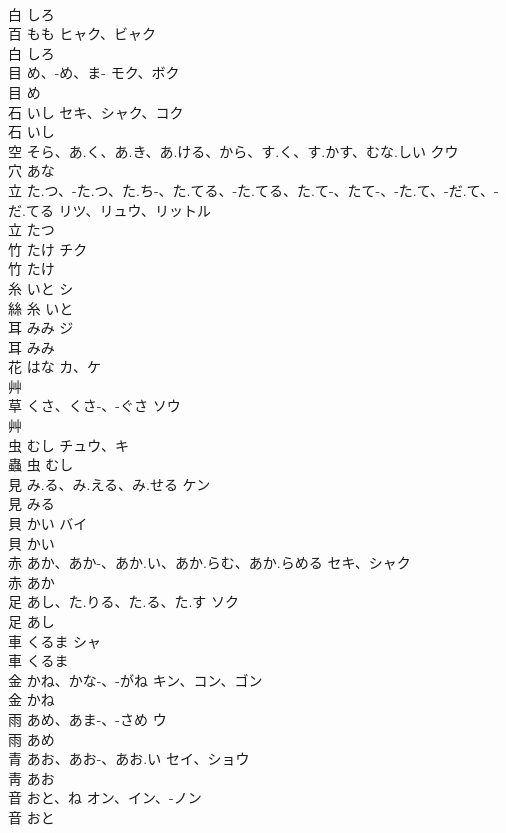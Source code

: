 \documentclass[8pt]{extreport}
\begin{document}
\begin{CJK}{UTF8}{min}
\\	白		しろ		
\\	百	もも	ヒャク、ビャク	
\\	白		しろ		
\\	目	め、-め、ま-	モク、ボク	
\\	目		め		
\\	石	いし	セキ、シャク、コク	
\\	石		いし		
\\	空	そら、あ.く、あ.き、あ.ける、から、す.く、す.かす、むな.しい	クウ	
\\	穴		あな		
\\	立	た.つ、-た.つ、た.ち-、た.てる、-た.てる、た.て-、たて-、-た.て、-だ.て、-だ.てる	リツ、リュウ、リットル	
\\	立		たつ		
\\	竹	たけ	チク	
\\	竹		たけ		
\\	糸	いと	シ	
\\	絲	糸		いと		
\\	耳	みみ	ジ	
\\	耳		みみ		
\\	花	はな	カ、ケ	
\\	艸				
\\	草	くさ、くさ-、-ぐさ	ソウ	
\\	艸				
\\	虫	むし	チュウ、キ	
\\	蟲	虫		むし		
\\	見	み.る、み.える、み.せる	ケン	
\\	見		みる		
\\	貝	かい	バイ	
\\	貝		かい		
\\	赤	あか、あか-、あか.い、あか.らむ、あか.らめる	セキ、シャク	
\\	赤		あか		
\\	足	あし、た.りる、た.る、た.す	ソク	
\\	足		あし		
\\	車	くるま	シャ	
\\	車		くるま		
\\	金	かね、かな-、-がね	キン、コン、ゴン	
\\	金		かね		
\\	雨	あめ、あま-、-さめ	ウ	
\\	雨		あめ		
\\	青	あお、あお-、あお.い	セイ、ショウ	
\\	靑		あお		
\\	音	おと、ね	オン、イン、-ノン	
\\	音		おと		

\end{CJK}
\end{document}
